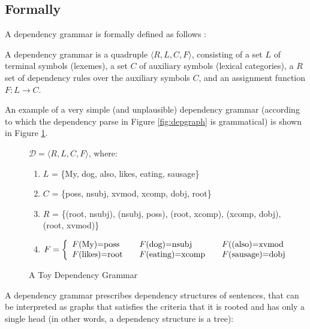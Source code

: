 \subsection{Formally}

A dependency grammar is formally defined as follows \citep{hays1964dependency,gaifman1965dependency}:

\begin{definition}\label{def:depgram}
A dependency grammar is a quadruple $\langle R,L,C,F\rangle$, consisting of a set $L$ of terminal symbols (lexemes), a set $C$ of auxiliary symbols (lexical categories), a $R$ set of dependency rules over the auxiliary symbols $C$, and an assignment function $F : L\rightarrow C$.
\end{definition}

An example of a very simple (and unplausible) dependency grammar (according to which the dependency parse in Figure \ref{fig:depgraph} is grammatical) is shown in Figure \ref{fig:depgrammar}.

\begin{figure}[!ht]
\begin{framed}
$\mathcal{D} = \langle R,L,C,F\rangle$, where:\begin{enumerate}
\item[] $L$ = \{My, dog, also, likes, eating, sausage\}
\item[] $C$ = \{poss, nsubj, xvmod, xcomp, dobj, root\}
\item[] $R$ = \{(root, nsubj), (nsubj, poss), (root, xcomp), (xcomp, dobj), (root, xvmod)\}
\item[] $F = \left\{
  \begin{array}{l l l}
	F\text{(My)=poss} & \quad F\text{(dog)=nsubj} & \quad F(\text{(also)=xvmod}\\
	F\text{(likes)=root}& \quad F\text{(eating)=xcomp} & \quad F\text{(sausage)=dobj} 
  \end{array} \right.$
\end{enumerate}
\end{framed}
\caption{A Toy Dependency Grammar}\label{fig:depgrammar}
\end{figure}


\noindent A dependency grammar prescribes dependency structures of sentences, that can be interpreted as graphs that satisfies the criteria that it is rooted and has only a single head (in other words, a dependency structure is a tree):

